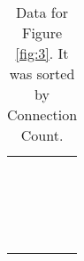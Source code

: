 \begin{table}[!htbp]
\begin{center}
\begin{minipage}{0.30\textwidth}
\begin{tabular}{|l | l|}
			 & \\
			 & \\
			 & \\
			 & \\
			 & \\
			 & \\
			 & \\
			 & \\
			 & \\
			 & \\
			 & \\
			 & \\
			 & \\
			 & \\
			 & \\
			 & \\
			 & \\	
			 & \\			 
			\hline
		\end{tabular}
	\end{minipage}	
	\caption*{\scriptsize Data for Figure \ref{fig:3}. It was sorted by Connection Count.}
	 \end{center}
\end{table}

